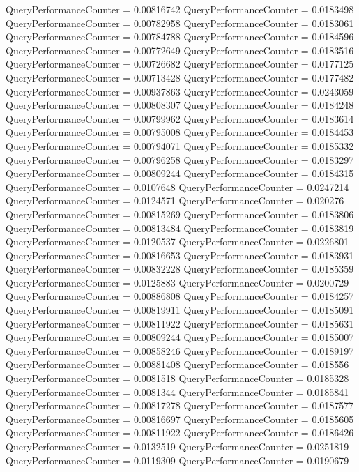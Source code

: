 \documentclass[9pt]{article}
\theoremstyle{plain}
\theoremstyle{definition}
\theoremstyle{remark}
\numberwithin{equation}{section}
\begin{document}
QueryPerformanceCounter  =  0.00816742
QueryPerformanceCounter  =  0.0183498
QueryPerformanceCounter  =  0.00782958
QueryPerformanceCounter  =  0.0183061
QueryPerformanceCounter  =  0.00784788
QueryPerformanceCounter  =  0.0184596
QueryPerformanceCounter  =  0.00772649
QueryPerformanceCounter  =  0.0183516
QueryPerformanceCounter  =  0.00726682
QueryPerformanceCounter  =  0.0177125
QueryPerformanceCounter  =  0.00713428
QueryPerformanceCounter  =  0.0177482
QueryPerformanceCounter  =  0.00937863
QueryPerformanceCounter  =  0.0243059
QueryPerformanceCounter  =  0.00808307
QueryPerformanceCounter  =  0.0184248
QueryPerformanceCounter  =  0.00799962
QueryPerformanceCounter  =  0.0183614
QueryPerformanceCounter  =  0.00795008
QueryPerformanceCounter  =  0.0184453
QueryPerformanceCounter  =  0.00794071
QueryPerformanceCounter  =  0.0185332
QueryPerformanceCounter  =  0.00796258
QueryPerformanceCounter  =  0.0183297
QueryPerformanceCounter  =  0.00809244
QueryPerformanceCounter  =  0.0184315
QueryPerformanceCounter  =  0.0107648
QueryPerformanceCounter  =  0.0247214
QueryPerformanceCounter  =  0.0124571
QueryPerformanceCounter  =  0.020276
QueryPerformanceCounter  =  0.00815269
QueryPerformanceCounter  =  0.0183806
QueryPerformanceCounter  =  0.00813484
QueryPerformanceCounter  =  0.0183819
QueryPerformanceCounter  =  0.0120537
QueryPerformanceCounter  =  0.0226801
QueryPerformanceCounter  =  0.00816653
QueryPerformanceCounter  =  0.0183931
QueryPerformanceCounter  =  0.00832228
QueryPerformanceCounter  =  0.0185359
QueryPerformanceCounter  =  0.0125883
QueryPerformanceCounter  =  0.0200729
QueryPerformanceCounter  =  0.00886808
QueryPerformanceCounter  =  0.0184257
QueryPerformanceCounter  =  0.00819911
QueryPerformanceCounter  =  0.0185091
QueryPerformanceCounter  =  0.00811922
QueryPerformanceCounter  =  0.0185631
QueryPerformanceCounter  =  0.00809244
QueryPerformanceCounter  =  0.0185007
QueryPerformanceCounter  =  0.00858246
QueryPerformanceCounter  =  0.0189197
QueryPerformanceCounter  =  0.00881408
QueryPerformanceCounter  =  0.018556
QueryPerformanceCounter  =  0.0081518
QueryPerformanceCounter  =  0.0185328
QueryPerformanceCounter  =  0.0081344
QueryPerformanceCounter  =  0.0185841
QueryPerformanceCounter  =  0.00817278
QueryPerformanceCounter  =  0.0187577
QueryPerformanceCounter  =  0.00816697
QueryPerformanceCounter  =  0.0185605
QueryPerformanceCounter  =  0.00811922
QueryPerformanceCounter  =  0.0186426
QueryPerformanceCounter  =  0.0132519
QueryPerformanceCounter  =  0.0251819
QueryPerformanceCounter  =  0.0119309
QueryPerformanceCounter  =  0.0190679
\end{document}
